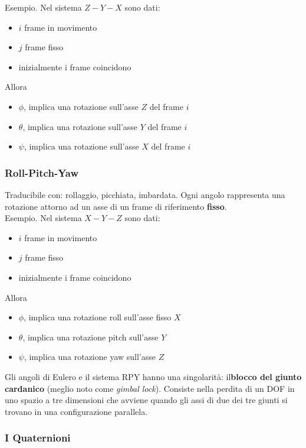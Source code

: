 \documentclass[a4paper,portrait,12pt]{article}
\theoremstyle{definition}
\begin{document}
Esempio. Nel sistema $Z-Y-X$ sono dati:
\begin{itemize}
\item $i$ frame in movimento
\item $j$ frame fisso
\item inizialmente i frame coincidono
\end{itemize}
Allora
\begin{itemize}
\item $\phi$, implica una rotazione sull'asse $Z$ del frame $i$
\item $\theta$, implica una rotazione sull'asse $Y$ del frame $i$
\item $\psi$, implica una rotazione sull'asse $X$ del frame $i$
\end{itemize}

\subsubsection{Roll-Pitch-Yaw}

Traducibile con: rollaggio, picchiata, imbardata.
Ogni angolo rappresenta una rotazione attorno ad un asse di un frame di riferimento \textbf{fisso}.\\

Esempio. Nel sistema $X-Y-Z$ sono dati:
\begin{itemize}
\item $i$ frame in movimento
\item $j$ frame fisso
\item inizialmente i frame coincidono
\end{itemize}
Allora
\begin{itemize}
\item $\phi$, implica una rotazione roll sull'asse fisso $X$
\item $\theta$, implica una rotazione pitch sull'asse $Y$
\item $\psi$, implica una rotazione yaw sull'asse $Z$
\end{itemize}

Gli angoli di Eulero e il sistema RPY hanno una singolarità: il\textbf{blocco del giunto cardanico} (meglio noto come \emph{gimbal lock}).
Consiste nella perdita di un DOF in uno spazio a tre dimensioni che avviene quando gli assi di due dei tre giunti si trovano in una configurazione parallela.

\subsubsection{I Quaternioni}
\end{document}
